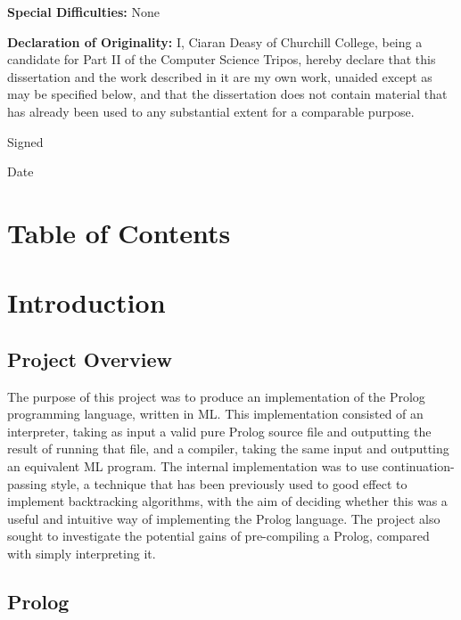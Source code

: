 \documentclass[12pt]{article}
\begin{document}
{\bf Special Difficulties:} None

{\bf Declaration of Originality:}
I, Ciaran Deasy of Churchill College, being a candidate for Part II of the Computer Science Tripos, hereby declare that this dissertation and the work described in it are my own work, unaided except as may be specified below, and that the dissertation does not contain material that has already been used to any substantial extent for a comparable purpose. 

Signed %

Date %

\vfil
\eject

\section*{Table of Contents}


\newpage

\section{Introduction}



\subsection{Project Overview}

The purpose of this project was to produce an implementation of the Prolog programming language, written in ML. This implementation consisted of an interpreter, taking as input a valid pure Prolog source file and outputting the result of running that file, and a compiler, taking the same input and outputting an equivalent ML program. The internal implementation was to use continuation-passing style, a technique that has been previously used to good effect to implement backtracking algorithms, with the aim of deciding whether this was a useful and intuitive way of implementing the Prolog language. The project also sought to investigate the potential gains of pre-compiling a Prolog, compared with simply interpreting it.

\subsection{Prolog}
\end{document}
